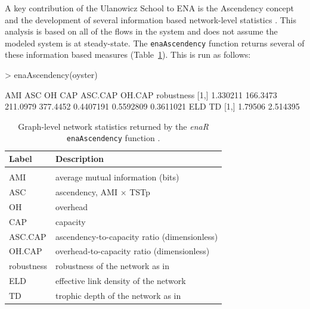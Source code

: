 \documentclass[article]{jss}
\begin{document}
A key contribution of the Ulanowicz School to ENA is the Ascendency
concept and the development of several information based network-level
statistics \citep{ulanowicz86, ulanowicz97}.  This analysis is based
on all of the flows in the system and does not assume the modeled
system is at steady-state.  The \texttt{enaAscendency} function
returns several of these information based measures
(Table~\ref{tab:asc}).  This is run as follows:

\begin{Schunk}
\begin{Sinput}
>   enaAscendency(oyster)
\end{Sinput}
\begin{Soutput}
          AMI      ASC       OH      CAP   ASC.CAP    OH.CAP robustness
[1,] 1.330211 166.3473 211.0979 377.4452 0.4407191 0.5592809  0.3611021
         ELD       TD
[1,] 1.79506 2.514395
\end{Soutput}
\end{Schunk}

\begin{table}[t]
  \caption{Graph-level network statistics returned by the \textit{enaR}
    \texttt{enaAscendency} function \citep[see][for
    interpretations]{ulanowicz86, ulanowicz97}.}\label{tab:asc}
  \center
  \begin{small}
    \begin{tabularx}{\textwidth}{l l}
      \textbf{Label} & \textbf{Description} \\ \hline \\[-1.5ex]
      AMI & average mutual information (bits) \\
      ASC & ascendency, AMI $\times$ TSTp \\
      OH & overhead \\
      CAP& capacity \\
      ASC.CAP& ascendency-to-capacity ratio (dimensionless)\\
      OH.CAP& overhead-to-capacity ratio (dimensionless)\\
      robustness & robustness of the network as in \citet{fath2014quantifying} \\
      ELD & effective link density of the network \citet{ulanowicz2014}\\
      TD & trophic depth of the network as in \citet{ulanowicz2014} \\
      \hline
    \end{tabularx}
  \end{small}
\end{table}
\end{document}
